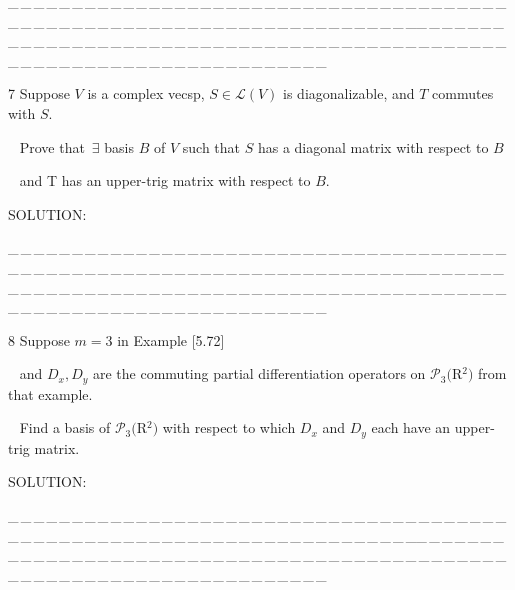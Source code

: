 \documentclass[a4paper, 11pt, UTF8]{article}
\def\Lm{\mathcal{L}}
\def\Po{\mathcal{P}}
\begin{document}
\begin{large}
\par
{\tiny \_\,\_\,\_\,\_\,\_\,\_\,\_\,\_\,\_\,\_\,\_\,\_\,\_\,\_\,\_\,\_\,\_\,\_\,\_\,\_\,\_\,\_\,\_\,\_\,\_\,\_\,\_\,\_\,\_\,\_\,\_\,\_\,\_\,\_\,\_\,\_\,\_\,\_\,\_\,\_\,\_\,\_\,\_\,\_\,\_\,\_\,\_\,\_\,\_\,\_\,\_\,\_\,\_\,\_\,\_\,\_\,\_\,\_\,\_\,\_\,\_\,\_\,\_\,\_\,\_\,\_\,\_\,\_\,\_\,\_\,\_\_\,\_\,\_\,\_\,\_\,\_\,\_\,\_\,\_\,\_\,\_\,\_\,\_\,\_\,\_\,\_\,\_\,\_\,\_\,\_\,\_\,\_\,\_\,\_\,\_\,\_\,\_\,\_\,\_\,\_\,\_\,\_\,\_\,\_\,\_\,\_\,\_\,\_\,\_\,\_\,\_\,\_\,\_\,\_\,\_\,\_\,\_\,\_\,\_\,\_\,\_\,\_\,\_\,\_\,\_\,\_\,\_\,\_\,\_\,\_\,\_\,\_\,\_\,\_\,\_\,\_\,\_\,\_\,\_\,\_\,\_}\par

{\timesbf\Large 7} {\timessl\Large 
Suppose $V$ is a complex vecsp, $S\in\Lm(V)$ is diagonalizable, and $T$ commutes with $S$.}\par\,\,\,
{\timessl\Large Prove that $\,\exists$ basis $B$ of $V$ such that $S$ has a diagonal matrix with respect to $B$}\par\,\,\,
{\timessl\Large and T has an upper-trig matrix with respect to $B$.
}\par
{\timesbf S\footnotesize{OLUTION:}}\par\quad

\par
{\tiny \_\,\_\,\_\,\_\,\_\,\_\,\_\,\_\,\_\,\_\,\_\,\_\,\_\,\_\,\_\,\_\,\_\,\_\,\_\,\_\,\_\,\_\,\_\,\_\,\_\,\_\,\_\,\_\,\_\,\_\,\_\,\_\,\_\,\_\,\_\,\_\,\_\,\_\,\_\,\_\,\_\,\_\,\_\,\_\,\_\,\_\,\_\,\_\,\_\,\_\,\_\,\_\,\_\,\_\,\_\,\_\,\_\,\_\,\_\,\_\,\_\,\_\,\_\,\_\,\_\,\_\,\_\,\_\,\_\,\_\,\_\_\,\_\,\_\,\_\,\_\,\_\,\_\,\_\,\_\,\_\,\_\,\_\,\_\,\_\,\_\,\_\,\_\,\_\,\_\,\_\,\_\,\_\,\_\,\_\,\_\,\_\,\_\,\_\,\_\,\_\,\_\,\_\,\_\,\_\,\_\,\_\,\_\,\_\,\_\,\_\,\_\,\_\,\_\,\_\,\_\,\_\,\_\,\_\,\_\,\_\,\_\,\_\,\_\,\_\,\_\,\_\,\_\,\_\,\_\,\_\,\_\,\_\,\_\,\_\,\_\,\_\,\_\,\_\,\_\,\_\,\_}\par

{\timesbf\Large 8} {\timessl\Large 
Suppose $m = 3$ in Example [5.72]}\par\,\,\,
{\timessl\Large and $D_x , D_y$ are the commuting partial differentiation operators on $\Po_3(${\timesbf R}$^2)$ from that example.}\par\,\,\,
{\timessl\Large Find a basis of $\Po_3(${\timesbf R}$^2)$ with respect to which $D_x$ and $D_y$ each have an upper-trig matrix.
}\par
{\timesbf S\footnotesize{OLUTION:}}\par\quad

\par
{\tiny \_\,\_\,\_\,\_\,\_\,\_\,\_\,\_\,\_\,\_\,\_\,\_\,\_\,\_\,\_\,\_\,\_\,\_\,\_\,\_\,\_\,\_\,\_\,\_\,\_\,\_\,\_\,\_\,\_\,\_\,\_\,\_\,\_\,\_\,\_\,\_\,\_\,\_\,\_\,\_\,\_\,\_\,\_\,\_\,\_\,\_\,\_\,\_\,\_\,\_\,\_\,\_\,\_\,\_\,\_\,\_\,\_\,\_\,\_\,\_\,\_\,\_\,\_\,\_\,\_\,\_\,\_\,\_\,\_\,\_\,\_\_\,\_\,\_\,\_\,\_\,\_\,\_\,\_\,\_\,\_\,\_\,\_\,\_\,\_\,\_\,\_\,\_\,\_\,\_\,\_\,\_\,\_\,\_\,\_\,\_\,\_\,\_\,\_\,\_\,\_\,\_\,\_\,\_\,\_\,\_\,\_\,\_\,\_\,\_\,\_\,\_\,\_\,\_\,\_\,\_\,\_\,\_\,\_\,\_\,\_\,\_\,\_\,\_\,\_\,\_\,\_\,\_\,\_\,\_\,\_\,\_\,\_\,\_\,\_\,\_\,\_\,\_\,\_\,\_\,\_\,\_}\par


\end{large}
\end{document}
